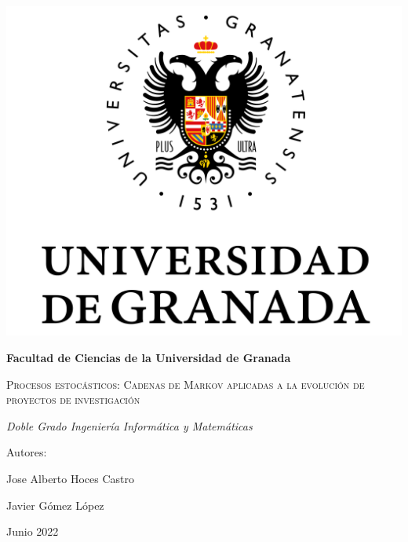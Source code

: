 \documentclass[10pt,a4paper]{article}
\begin{document}
	
\begin{titlepage}
	\centering
	{\includegraphics[scale=0.5]{Logo_UGR.png}\par}
	\vspace{1cm}
	{\bfseries\Large Facultad de Ciencias de la Universidad de Granada \par}
	\vspace{2.5cm}
	{\scshape\Huge Procesos estocásticos: Cadenas de Markov aplicadas a la evolución de proyectos de investigación \par}
	\vspace{3cm}
	{\itshape\Large Doble Grado Ingeniería Informática y Matemáticas}
	\vfill
	{\Large Autores: \par}
	{\Large Jose Alberto Hoces Castro\par}
	{\Large Javier Gómez López \par}
	\vfill
	{\Large Junio 2022 \par}
\end{titlepage}

\thispagestyle{empty}
\null
\vfill
\end{document}
